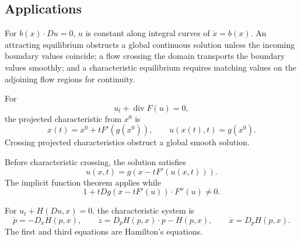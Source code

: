\subsection{Applications}
\label{sec:characteristics-applications}

\begin{example}
\label{ex:linear-transport-characteristics-flow}

For $b(x)\cdot Du=0$, $u$ is constant along integral curves of $\dot x=b(x)$.
An attracting equilibrium obstructs a global continuous solution unless the
incoming boundary values coincide; a flow crossing the domain transports the
boundary values smoothly; and a characteristic equilibrium requires matching
values on the adjoining flow regions for continuity.
\end{example}

\begin{example}
\label{ex:characteristics-conservation-laws}

For
\[
u_t+\operatorname{div}F(u)=0,
\]
the projected characteristic from $x^0$ is
\[
x(t)=x^0+tF'(g(x^0)),\qquad u(x(t),t)=g(x^0).
\]
Crossing projected characteristics obstruct a global smooth solution.
\end{example}

\begin{remark}
\label{rem:implicit-formula-conservation-law}

Before characteristic crossing, the solution satisfies
\[
u(x,t)=g(x-tF'(u(x,t))).
\]
The implicit function theorem applies while
\[
1+tDg(x-tF'(u))\cdot F''(u)\ne0.
\]
\end{remark}

\begin{example}
\label{ex:characteristics-hamilton-jacobi}

For $u_t+H(Du,x)=0$, the characteristic system is
\[
\dot p=-D_xH(p,x),\qquad
\dot z=D_pH(p,x)\cdot p-H(p,x),\qquad
\dot x=D_pH(p,x).
\]
The first and third equations are Hamilton's equations.
\end{example}

